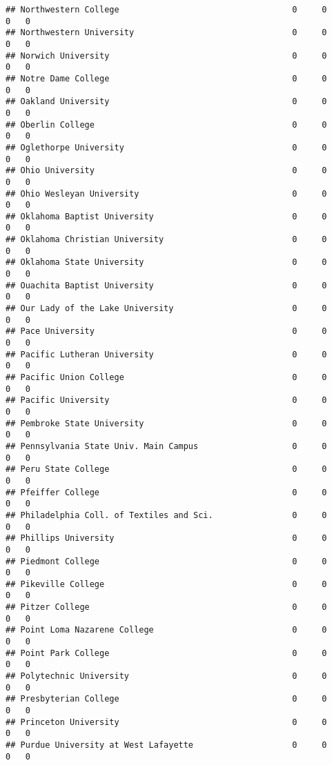 \documentclass[
]{article}
\begin{document}
\begin{verbatim}
## Northwestern College                                   0     0        0   0
## Northwestern University                                0     0        0   0
## Norwich University                                     0     0        0   0
## Notre Dame College                                     0     0        0   0
## Oakland University                                     0     0        0   0
## Oberlin College                                        0     0        0   0
## Oglethorpe University                                  0     0        0   0
## Ohio University                                        0     0        0   0
## Ohio Wesleyan University                               0     0        0   0
## Oklahoma Baptist University                            0     0        0   0
## Oklahoma Christian University                          0     0        0   0
## Oklahoma State University                              0     0        0   0
## Ouachita Baptist University                            0     0        0   0
## Our Lady of the Lake University                        0     0        0   0
## Pace University                                        0     0        0   0
## Pacific Lutheran University                            0     0        0   0
## Pacific Union College                                  0     0        0   0
## Pacific University                                     0     0        0   0
## Pembroke State University                              0     0        0   0
## Pennsylvania State Univ. Main Campus                   0     0        0   0
## Peru State College                                     0     0        0   0
## Pfeiffer College                                       0     0        0   0
## Philadelphia Coll. of Textiles and Sci.                0     0        0   0
## Phillips University                                    0     0        0   0
## Piedmont College                                       0     0        0   0
## Pikeville College                                      0     0        0   0
## Pitzer College                                         0     0        0   0
## Point Loma Nazarene College                            0     0        0   0
## Point Park College                                     0     0        0   0
## Polytechnic University                                 0     0        0   0
## Presbyterian College                                   0     0        0   0
## Princeton University                                   0     0        0   0
## Purdue University at West Lafayette                    0     0        0   0

\end{verbatim}
\end{document}
